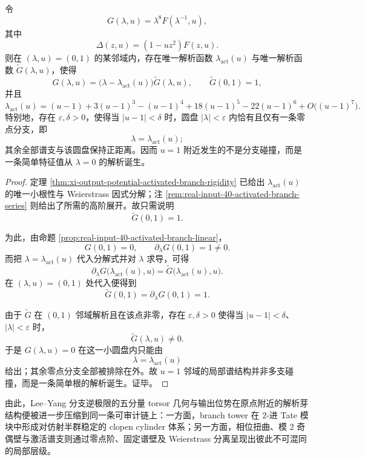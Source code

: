 \begin{theorem}\label{thm:xi-time-part62dg-activated-branch-weierstrass-separation}
令
\[
G(\lambda,u)=\lambda^8F(\lambda^{-1},u),
\]
其中
\[
\Delta(z,u)=(1-uz^2)F(z,u).
\]
则在 \((\lambda,u)=(0,1)\) 的某邻域内，存在唯一解析函数 \(\lambda_{\mathrm{act}}(u)\) 与唯一解析函数 \(\widetilde G(\lambda,u)\)，使得
\[
G(\lambda,u)
=
\bigl(\lambda-\lambda_{\mathrm{act}}(u)\bigr)\widetilde G(\lambda,u),
\qquad
\widetilde G(0,1)=1,
\]
并且
\[
\lambda_{\mathrm{act}}(u)
=
(u-1)+3(u-1)^3-(u-1)^4+18(u-1)^5-22(u-1)^6
+O\!\bigl((u-1)^7\bigr).
\]
特别地，存在 \(\varepsilon,\delta>0\)，使得当 \(|u-1|<\delta\) 时，圆盘 \(|\lambda|<\varepsilon\) 内恰有且仅有一条零点分支，即
\[
\lambda=\lambda_{\mathrm{act}}(u);
\]
其余全部谱支与该圆盘保持正距离。因而 \(u=1\) 附近发生的不是分支碰撞，而是一条简单特征值从 \(\lambda=0\) 的解析诞生。
\end{theorem}
\begin{proof}
定理 \ref{thm:xi-output-potential-activated-branch-rigidity} 已给出 \(\lambda_{\mathrm{act}}(u)\) 的唯一小根性与 Weierstrass 因式分解；注 \ref{rem:real-input-40-activated-branch-series} 则给出了所需的高阶展开。故只需说明
\[
\widetilde G(0,1)=1.
\]

为此，由命题 \ref{prop:real-input-40-activated-branch-linear}，
\[
G(0,1)=0,
\qquad
\partial_\lambda G(0,1)=1\neq 0.
\]
而把 \(\lambda=\lambda_{\mathrm{act}}(u)\) 代入分解式并对 \(\lambda\) 求导，可得
\[
\partial_\lambda G\bigl(\lambda_{\mathrm{act}}(u),u\bigr)
=
\widetilde G\bigl(\lambda_{\mathrm{act}}(u),u\bigr).
\]
在 \((\lambda,u)=(0,1)\) 处代入便得到
\[
\widetilde G(0,1)=\partial_\lambda G(0,1)=1.
\]

由于 \(\widetilde G\) 在 \((0,1)\) 邻域解析且在该点非零，存在 \(\varepsilon,\delta>0\) 使得当 \(|u-1|<\delta\)、\(|\lambda|<\varepsilon\) 时，
\[
\widetilde G(\lambda,u)\neq 0.
\]
于是 \(G(\lambda,u)=0\) 在这一小圆盘内只能由
\[
\lambda=\lambda_{\mathrm{act}}(u)
\]
给出；其余零点分支全部被排除在外。故 \(u=1\) 邻域的局部谱结构并非多支碰撞，而是一条简单根的解析诞生。证毕。
\end{proof}

\noindent
由此，Lee--Yang 分支逆极限的五分量 torsor 几何与输出位势在原点附近的解析芽结构便被进一步压缩到同一条可审计链上：一方面，branch tower 在 \(2\)-进 Tate 模块中形成对仿射半群稳定的 clopen cylinder 体系；另一方面，相位扭曲、模 \(2\) 奇偶壁与激活谱支则通过零点阶、固定谱壁及 Weierstrass 分离呈现出彼此不可混同的局部层级。

\endinput
